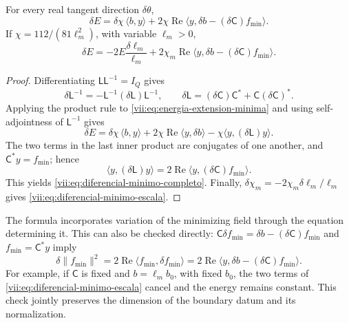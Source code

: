 \begin{theorem}
\label{vii:thm:diferencial-minimo}
For every real tangent direction \(\delta\theta\),
\begin{equation}
 \delta E
 =\delta\chi\,\langle b,y\rangle
   +2\chi\operatorname{Re}
       \langle y,\delta b-(\delta\mathsf C)f_{\min}\rangle.
 \label{vii:eq:diferencial-minimo-completo}
\end{equation}
If \(\chi=112/(81\ell_m^2)\), with variable \(\ell_m>0\),
\begin{equation}
 \delta E=-2E\frac{\delta\ell_m}{\ell_m}
 +2\chi_m\operatorname{Re}
       \langle y,\delta b-(\delta\mathsf C)f_{\min}\rangle.
 \label{vii:eq:diferencial-minimo-escala}
\end{equation}
\end{theorem}

\begin{proof}
Differentiating \(\mathsf L\mathsf L^{-1}=I_Q\) gives
\[
 \delta\mathsf L^{-1}
 =-\mathsf L^{-1}(\delta\mathsf L)\mathsf L^{-1},\qquad
 \delta\mathsf L=(\delta\mathsf C)\mathsf C^*
                      +\mathsf C(\delta\mathsf C)^*.
\]
Applying the product rule to \eqref{vii:eq:energia-extension-minima}
and using self-adjointness of \(\mathsf L^{-1}\) gives
\[
 \delta E=\delta\chi\,\langle b,y\rangle
 +2\chi\operatorname{Re}\langle y,\delta b\rangle
 -\chi\langle y,(\delta\mathsf L)y\rangle.
\]
The two terms in the last inner product are conjugates of one another,
and \(\mathsf C^*y=f_{\min}\); hence
\[
 \langle y,(\delta\mathsf L)y\rangle
 =2\operatorname{Re}\langle y,(\delta\mathsf C)f_{\min}\rangle.
\]
This yields \eqref{vii:eq:diferencial-minimo-completo}.
Finally, \(\delta\chi_m=-2\chi_m\delta\ell_m/\ell_m\)
gives \eqref{vii:eq:diferencial-minimo-escala}.
\end{proof}

The formula incorporates variation of the minimizing field through
the equation determining it. This can also be checked directly:
\(\mathsf C\delta f_{\min}=\delta b-(\delta\mathsf C)f_{\min}\)
and \(f_{\min}=\mathsf C^*y\) imply
\[
 \delta\|f_{\min}\|^2
 =2\operatorname{Re}\langle f_{\min},\delta f_{\min}\rangle
 =2\operatorname{Re}
     \langle y,\delta b-(\delta\mathsf C)f_{\min}\rangle.
\]
For example, if \(\mathsf C\) is fixed and \(b=\ell_m b_0\),
with fixed \(b_0\), the two terms of
\eqref{vii:eq:diferencial-minimo-escala} cancel and the energy
remains constant. This check jointly preserves the dimension of the
boundary datum and its normalization.

